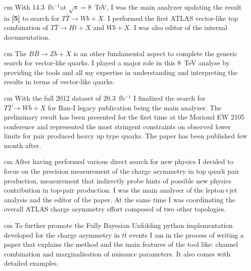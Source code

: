 \documentclass[12pt]{article}
\begin{document}
 cm
\noindent {\bf \color{red} [7]} With 14.3~fb$^{-1}$at $\sqrt{s}=8$~TeV, I was the main analyzer updating the result in {\bf \color{red} [5]} to search for  $T\bar{T} \rightarrow Wb+X$. I performed the first ATLAS vector-like top combination of $T\bar{T} \rightarrow Ht+X$ and $ Wb+X$. I was also editor of the internal documentation.

 cm
\noindent {\bf \color{red} [8]} The $B\bar{B} \rightarrow Zb+X$ is an other fundamental aspect to complete the generic search for vector-like quarks. I played a major role in this 8~TeV analyse by providing the tools and all my expertise in  understanding and interpreting the results in terms of vector-like quarks. 

 cm
\noindent {\bf \color{red} [9]} With the full 2012 dataset of 20.3~fb$^{-1}$ I finalized the search for $T\bar{T} \rightarrow Wb+X$  for Run-I legacy publication being the main analyzer. The preliminary result has been presented for the first time at the Moriond EW 2105 conference and represented the most stringent constraints on observed lower limits for pair produced heavy up type quarks. The paper has been published few month after.

 cm
\noindent {\bf \color{red} [10]} After having performed various direct search for new physics I decided to focus on the precision measurement of the charge asymmetry in top quark pair production, measurement that indirectly probe hints of possible new physics contribution in top-pair production. I was the main analyser of the lepton+jet analysis and the editor of the paper. At the same time I was coordinating the overall ATLAS charge asymmetry effort composed of two other topologies.

 cm
\noindent {\bf \color{red} [11]} To further promote the Fully Bayesian Unfolding python implementation developed for the charge asymmetry in $t\bar{t}$ events I am in the process of writing a paper that explains the method and the main features of the tool like: channel combination and marginalisation of nuisance parameters. It also comes with detailed examples. 
\end{document}

